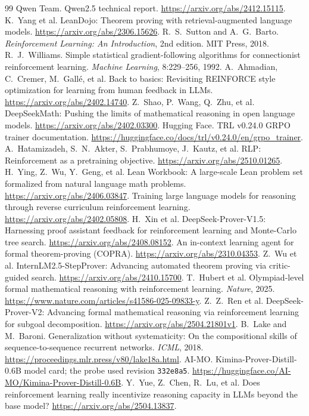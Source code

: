 \documentclass[11pt]{article}
\newcommand{\code}[1]{\texttt{#1}}
\begin{document}
\begin{thebibliography}{99}
 Qwen Team. Qwen2.5 technical report. \url{https://arxiv.org/abs/2412.15115}.
 K.~Yang et al. LeanDojo: Theorem proving with retrieval-augmented language models. \url{https://arxiv.org/abs/2306.15626}.
 R.~S.~Sutton and A.~G.~Barto. \emph{Reinforcement Learning: An Introduction}, 2nd edition. MIT Press, 2018.
 R.~J.~Williams. Simple statistical gradient-following algorithms for connectionist reinforcement learning. \emph{Machine Learning}, 8:229--256, 1992.
 A.~Ahmadian, C.~Cremer, M.~Gall\'e, et al. Back to basics: Revisiting REINFORCE style optimization for learning from human feedback in LLMs. \url{https://arxiv.org/abs/2402.14740}.
 Z.~Shao, P.~Wang, Q.~Zhu, et al. DeepSeekMath: Pushing the limits of mathematical reasoning in open language models. \url{https://arxiv.org/abs/2402.03300}.
 Hugging Face. TRL v0.24.0 GRPO trainer documentation. \url{https://huggingface.co/docs/trl/v0.24.0/en/grpo_trainer}.
 A.~Hatamizadeh, S.~N.~Akter, S.~Prabhumoye, J.~Kautz, et al. RLP: Reinforcement as a pretraining objective. \url{https://arxiv.org/abs/2510.01265}.
 H.~Ying, Z.~Wu, Y.~Geng, et al. Lean Workbook: A large-scale Lean problem set formalized from natural language math problems. \url{https://arxiv.org/abs/2406.03847}.
 Training large language models for reasoning through reverse curriculum reinforcement learning. \url{https://arxiv.org/abs/2402.05808}.
 H.~Xin et al. DeepSeek-Prover-V1.5: Harnessing proof assistant feedback for reinforcement learning and Monte-Carlo tree search. \url{https://arxiv.org/abs/2408.08152}.
 An in-context learning agent for formal theorem-proving (COPRA). \url{https://arxiv.org/abs/2310.04353}.
 Z.~Wu et al. InternLM2.5-StepProver: Advancing automated theorem proving via critic-guided search. \url{https://arxiv.org/abs/2410.15700}.
 T.~Hubert et al. Olympiad-level formal mathematical reasoning with reinforcement learning. \emph{Nature}, 2025. \url{https://www.nature.com/articles/s41586-025-09833-y}.
 Z.~Z.~Ren et al. DeepSeek-Prover-V2: Advancing formal mathematical reasoning via reinforcement learning for subgoal decomposition. \url{https://arxiv.org/abs/2504.21801v1}.
 B.~Lake and M.~Baroni. Generalization without systematicity: On the compositional skills of sequence-to-sequence recurrent networks. \emph{ICML}, 2018. \url{https://proceedings.mlr.press/v80/lake18a.html}.
 AI-MO. Kimina-Prover-Distill-0.6B model card; the probe used revision \code{332e8a5}. \url{https://huggingface.co/AI-MO/Kimina-Prover-Distill-0.6B}.
 Y.~Yue, Z.~Chen, R.~Lu, et al. Does reinforcement learning really incentivize reasoning capacity in LLMs beyond the base model? \url{https://arxiv.org/abs/2504.13837}.
\end{thebibliography}
\end{document}
